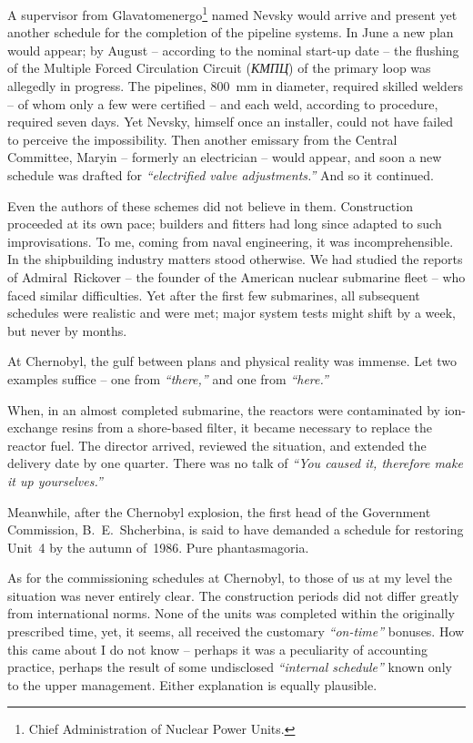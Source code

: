 \documentclass[openright]{bookest}
\begin{document}
A supervisor from Glavatomenergo\footnote{Chief Administration of Nuclear Power Units.} named Nevsky would arrive and present yet another schedule for the completion of the pipeline systems. In June a new plan would appear; by August -- according to the nominal start-up date -- the flushing of the Multiple Forced Circulation Circuit (\textit{КМПЦ}) of the primary loop was allegedly in progress. The pipelines, \qty{800}{\milli\metre} in diameter, required skilled welders -- of whom only a few were certified -- and each weld, according to procedure, required seven days. Yet Nevsky, himself once an installer, could not have failed to perceive the impossibility. Then another emissary from the Central Committee, Maryin -- formerly an electrician -- would appear, and soon a new schedule was drafted for \textit{``electrified valve adjustments.''} And so it continued.

Even the authors of these schemes did not believe in them. Construction proceeded at its own pace; builders and fitters had long since adapted to such improvisations. To me, coming from naval engineering, it was incomprehensible. In the shipbuilding industry matters stood otherwise. We had studied the reports of Admiral~Rickover -- the founder of the American nuclear submarine fleet -- who faced similar difficulties. Yet after the first few submarines, all subsequent schedules were realistic and were met; major system tests might shift by a week, but never by months.

At Chernobyl, the gulf between plans and physical reality was immense. Let two examples suffice -- one from \textit{``there,''} and one from \textit{``here.''}

When, in an almost completed submarine, the reactors were contaminated by ion-exchange resins from a shore-based filter, it became necessary to replace the reactor fuel. The director arrived, reviewed the situation, and extended the delivery date by one quarter. There was no talk of \textit{``You caused it, therefore make it up yourselves.''}

Meanwhile, after the Chernobyl explosion, the first head of the Government Commission, B.~E.~Shcherbina, is said to have demanded a schedule for restoring Unit~4 by the autumn of~1986. Pure phantasmagoria.


As for the commissioning schedules at Chernobyl, to those of us at my level the situation was never entirely clear. The construction periods did not differ greatly from international norms. None of the units was completed within the originally prescribed time, yet, it seems, all received the customary \textit{``on-time''} bonuses. How this came about I do not know -- perhaps it was a peculiarity of accounting practice, perhaps the result of some undisclosed \textit{``internal schedule''} known only to the upper management. Either explanation is equally plausible.
\end{document}
